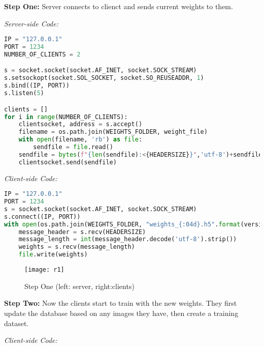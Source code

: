 \textbf{Step One:} Server connects to clienct and sends current weights to them.

\textit{Server-side Code:}

\begin{center}{\begin{minipage}{0.9\linewidth}
\begin{lstlisting}[language=Python, basicstyle=\fontsize{10}{10}\selectfont\ttfamily]
IP = "127.0.0.1"
PORT = 1234
NUMBER_OF_CLIENTS = 2

s = socket.socket(socket.AF_INET, socket.SOCK_STREAM)
s.setsockopt(socket.SOL_SOCKET, socket.SO_REUSEADDR, 1)
s.bind((IP, PORT))
s.listen(5)

clients = []
for i in range(NUMBER_OF_CLIENTS):
    clientsocket, address = s.accept()
    filename = os.path.join(WEIGHTS_FOLDER, weight_file)
    with open(filename, 'rb') as file:
        sendfile = file.read()
    sendfile = bytes(f"{len(sendfile):<{HEADERSIZE}}",'utf-8')+sendfile
    clientsocket.send(sendfile)
\end{lstlisting}
\end{minipage}}\end{center}

\textit{Client-side Code:}

\begin{center}{\begin{minipage}{0.9\linewidth}
\begin{lstlisting}[language=Python, basicstyle=\fontsize{10}{10}\selectfont\ttfamily]
IP = "127.0.0.1"
PORT = 1234
s = socket.socket(socket.AF_INET, socket.SOCK_STREAM)
s.connect((IP, PORT))
with open(os.path.join(WEIGHTS_FOLDER, "weights_{:04d}.h5".format(version)),'wb') as file:
    message_header = s.recv(HEADERSIZE)
    message_length = int(message_header.decode('utf-8').strip())
    weights = s.recv(message_length)
    file.write(weights)
\end{lstlisting}
\end{minipage}}\end{center}

\begin{figure}[H]
	\centering
	\texttt{[image: r1]}
	\caption{Step One (left: server, right:clients)}
	\label{f10}
\end{figure}

\textbf{Step Two:} Now the clients start to train with the new weights. They first update the database based on any images they have, then create a training dataset. 

\textit{Client-side Code:}


